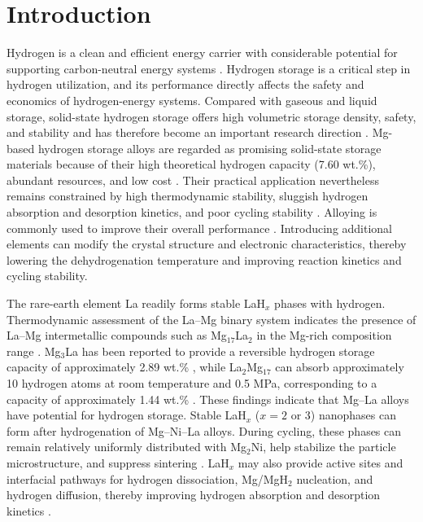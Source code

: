 \documentclass[preprint,12pt]{elsarticle}
\begin{document}
\section{Introduction}
Hydrogen is a clean and efficient energy carrier with considerable potential for supporting carbon-neutral energy systems \cite{ref1}. Hydrogen storage is a critical step in hydrogen utilization, and its performance directly affects the safety and economics of hydrogen-energy systems. Compared with gaseous and liquid storage, solid-state hydrogen storage offers high volumetric storage density, safety, and stability and has therefore become an important research direction \cite{ref2}. Mg-based hydrogen storage alloys are regarded as promising solid-state storage materials because of their high theoretical hydrogen capacity (7.60 wt.\%), abundant resources, and low cost \cite{ref3}. Their practical application nevertheless remains constrained by high thermodynamic stability, sluggish hydrogen absorption and desorption kinetics, and poor cycling stability \cite{ref4}. Alloying is commonly used to improve their overall performance \cite{ref5,ref6,ref7}. Introducing additional elements can modify the crystal structure and electronic characteristics, thereby lowering the dehydrogenation temperature and improving reaction kinetics and cycling stability.

The rare-earth element La readily forms stable LaH$_x$ phases with hydrogen. Thermodynamic assessment of the La--Mg binary system indicates the presence of La--Mg intermetallic compounds such as Mg$_{17}$La$_2$ in the Mg-rich composition range \cite{ref8}. Mg$_3$La has been reported to provide a reversible hydrogen storage capacity of approximately 2.89 wt.\% \cite{ref9}, while La$_2$Mg$_{17}$ can absorb approximately 10 hydrogen atoms at room temperature and 0.5 MPa, corresponding to a capacity of approximately 1.44 wt.\% \cite{ref10}. These findings indicate that Mg--La alloys have potential for hydrogen storage. Stable LaH$_x$ ($x=2$ or 3) nanophases can form after hydrogenation of Mg--Ni--La alloys. During cycling, these phases can remain relatively uniformly distributed with Mg$_2$Ni, help stabilize the particle microstructure, and suppress sintering \cite{ref11}. LaH$_x$ may also provide active sites and interfacial pathways for hydrogen dissociation, Mg/MgH$_2$ nucleation, and hydrogen diffusion, thereby improving hydrogen absorption and desorption kinetics \cite{ref11,ref12}.
\end{document}
